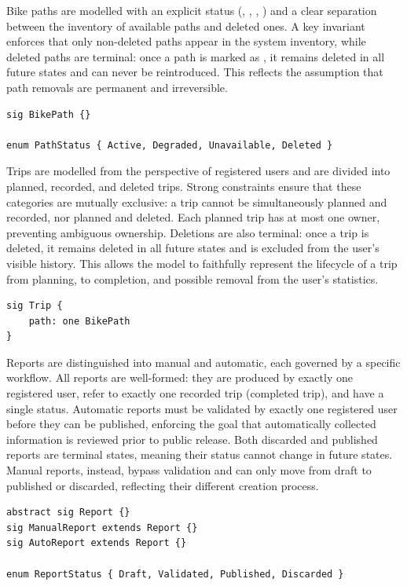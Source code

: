 Bike paths are modelled with an explicit status (, , , ) and a clear separation between the inventory of available paths and deleted ones. A key invariant enforces that only non-deleted paths appear in the system inventory, while deleted paths are terminal: once a path is marked as , it remains deleted in all future states and can never be reintroduced. This reflects the assumption that path removals are permanent and irreversible.

\begin{lstlisting}[caption=Bike Path Signature.]
sig BikePath {}

enum PathStatus { Active, Degraded, Unavailable, Deleted }
\end{lstlisting}

Trips are modelled from the perspective of registered users and are divided into planned, recorded, and deleted trips. Strong constraints ensure that these categories are mutually exclusive: a trip cannot be simultaneously planned and recorded, nor planned and deleted. Each planned trip has at most one owner, preventing ambiguous ownership. Deletions are also terminal: once a trip is deleted, it remains deleted in all future states and is excluded from the user’s visible history. This allows the model to faithfully represent the lifecycle of a trip from planning, to completion, and possible removal from the user’s statistics.

\begin{lstlisting}[caption=Trip Signature.]
sig Trip {
    path: one BikePath
}
\end{lstlisting}

Reports are distinguished into manual and automatic, each governed by a specific workflow. All reports are well-formed: they are produced by exactly one registered user, refer to exactly one recorded trip (completed trip), and have a single status. Automatic reports must be validated by exactly one registered user before they can be published, enforcing the goal that automatically collected information is reviewed prior to public release. Both discarded and published reports are terminal states, meaning their status cannot change in future states. Manual reports, instead, bypass validation and can only move from draft to published or discarded, reflecting their different creation process.

\begin{lstlisting}[caption=Report Signature.]
abstract sig Report {}
sig ManualReport extends Report {}
sig AutoReport extends Report {}

enum ReportStatus { Draft, Validated, Published, Discarded }
\end{lstlisting}

